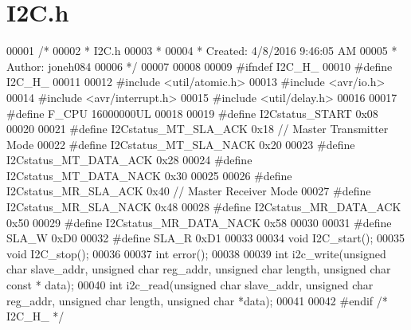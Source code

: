 \hypertarget{sensor_2sensor_2_i2_c_8h_source}{}\section{I2\+C.\+h}
\label{sensor_2sensor_2_i2_c_8h_source}

\begin{DoxyCode}
00001 \textcolor{comment}{/*}
00002 \textcolor{comment}{ * I2C.h}
00003 \textcolor{comment}{ *}
00004 \textcolor{comment}{ * Created: 4/8/2016 9:46:05 AM}
00005 \textcolor{comment}{ *  Author: joneh084}
00006 \textcolor{comment}{ */} 
00007 
00008 
00009 \textcolor{preprocessor}{#ifndef I2C\_H\_}
00010 \textcolor{preprocessor}{#define I2C\_H\_}
00011 
00012 \textcolor{preprocessor}{#include <util/atomic.h>}
00013 \textcolor{preprocessor}{#include <avr/io.h>}
00014 \textcolor{preprocessor}{#include <avr/interrupt.h>}
00015 \textcolor{preprocessor}{#include <util/delay.h>}
00016 
00017 \textcolor{preprocessor}{#define F\_CPU 16000000UL}
00018 
00019 \textcolor{preprocessor}{#define I2Cstatus\_START 0x08}
00020 
00021 \textcolor{preprocessor}{#define I2Cstatus\_MT\_SLA\_ACK 0x18       // Master Transmitter Mode}
00022 \textcolor{preprocessor}{#define I2Cstatus\_MT\_SLA\_NACK 0x20}
00023 \textcolor{preprocessor}{#define I2Cstatus\_MT\_DATA\_ACK 0x28}
00024 \textcolor{preprocessor}{#define I2Cstatus\_MT\_DATA\_NACK 0x30}
00025 
00026 \textcolor{preprocessor}{#define I2Cstatus\_MR\_SLA\_ACK 0x40       // Master Receiver Mode}
00027 \textcolor{preprocessor}{#define I2Cstatus\_MR\_SLA\_NACK 0x48}
00028 \textcolor{preprocessor}{#define I2Cstatus\_MR\_DATA\_ACK 0x50}
00029 \textcolor{preprocessor}{#define I2Cstatus\_MR\_DATA\_NACK 0x58}
00030 
00031 \textcolor{preprocessor}{#define SLA\_W 0xD0}
00032 \textcolor{preprocessor}{#define SLA\_R 0xD1}
00033 
00034 \textcolor{keywordtype}{void} I2C\_start();
00035 \textcolor{keywordtype}{void} I2C\_stop();
00036 
00037 \textcolor{keywordtype}{int} error();
00038 
00039 \textcolor{keywordtype}{int} i2c\_write(\textcolor{keywordtype}{unsigned} \textcolor{keywordtype}{char} slave\_addr, \textcolor{keywordtype}{unsigned} \textcolor{keywordtype}{char} reg\_addr, \textcolor{keywordtype}{unsigned} \textcolor{keywordtype}{char} length, \textcolor{keywordtype}{unsigned} \textcolor{keywordtype}{char} \textcolor{keyword}{const} *
      data);
00040 \textcolor{keywordtype}{int} i2c\_read(\textcolor{keywordtype}{unsigned} \textcolor{keywordtype}{char} slave\_addr, \textcolor{keywordtype}{unsigned} \textcolor{keywordtype}{char} reg\_addr, \textcolor{keywordtype}{unsigned} \textcolor{keywordtype}{char} length, \textcolor{keywordtype}{unsigned} \textcolor{keywordtype}{char} *data);
00041 
00042 \textcolor{preprocessor}{#endif }\textcolor{comment}{/* I2C\_H\_ */}\textcolor{preprocessor}{}
\end{DoxyCode}
